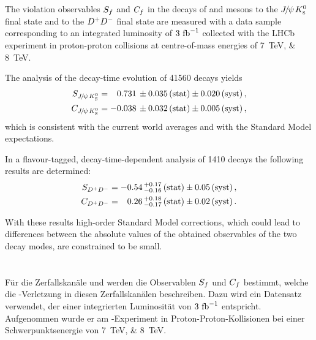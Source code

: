 
\section*{\centering\abstractname}
The \CP violation observables $S_{f}$ and $C_{f}$ in the decays of \Bd and \Bzb mesons
to the ${{J\mskip -3mu/\mskip -2mu\psi\mskip 2mu}}{{K}^0_{\mathrm{ \scriptscriptstyle S}}}$ final state and to the ${{D}^+}{{D}^-}$ final state are measured with
a data sample corresponding to an integrated luminosity of $\SI{3}{\ensuremath{\mbox{\,fb}^{-1}}}$
collected with the LHCb experiment in proton-proton collisions at
centre-of-mass energies of \SIlist{7;8}{\TeV}.

The analysis of the decay-time evolution of \num{41560} \BdToJPsiKS decays yields
\begin{align*}
  S_{{{J\mskip -3mu/\mskip -2mu\psi\mskip 2mu}}{{K}^0_{\mathrm{ \scriptscriptstyle S}}}} &=  \phantom{-}0.731 \, \pm 0.035 \, \text{(stat)} \pm 0.020 \, \text{(syst)}\,, \\
  C_{{{J\mskip -3mu/\mskip -2mu\psi\mskip 2mu}}{{K}^0_{\mathrm{ \scriptscriptstyle S}}}} &=  			- 0.038 \, \pm 0.032 \, \text{(stat)} \pm 0.005 \, \text{(syst)}\,,
\end{align*}
which is consistent with the current world averages and with the
Standard Model expectations.

In a flavour-tagged, decay-time-dependent analysis of \num{1410} \BdToDD
decays the following results are determined:
\begin{align*}
  S_{{{D}^+}{{D}^-}} &=  -0.54 \, ^{+0.17}_{-0.16} \, \text{(stat)} \pm 0.05 \, \text{(syst)}\,, \\
  C_{{{D}^+}{{D}^-}} &=  \phantom{-}0.26 \, ^{+0.18}_{-0.17} \, \text{(stat)} \pm 0.02 \, \text{(syst)}\,.
\end{align*}

With these results high-order Standard Model corrections, which could lead to
differences between the absolute values of the obtained observables of the two
decay modes, are constrained to be small.


\section*{\centering\abstractname}
Für die Zerfallskanäle \BdToJPsiKS und \BdToDD werden die Observablen $S_{f}$
und $C_{f}$ bestimmt, welche die \CP-Verletzung in diesen Zerfallskanälen
beschreiben. Dazu wird ein Datensatz verwendet, der einer integrierten
Luminosität von $\SI{3}{\ensuremath{\mbox{\,fb}^{-1}}}$ entspricht. Aufgenommen wurde er am
\lhcb-Experiment in Proton-Proton-Kollisionen bei einer Schwerpunktsenergie
von \SIlist[list-pair-separator={ und }]{7;8}{\TeV}.

